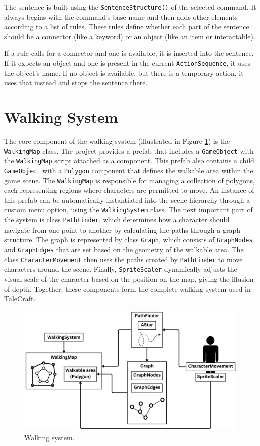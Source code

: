 The sentence is built using the \verb|SentenceStructure()| of the selected command. It always begins with the command’s base name and then adds other elements according to a list of rules. These rules define whether each part of the sentence should be a connector (like a keyword) or an object (like an item or interactable).

If a rule calls for a connector and one is available, it is inserted into the sentence. If it expects an object and one is present in the current \verb|ActionSequence|, it uses the object's name. If no object is available, but there is a temporary action, it uses that instead and stops the sentence there.


\section{Walking System}
\label{Walkingystem}
The core component of the walking system (illustrated in Figure \ref{fig:WalkingSys}) is the \verb|WalkingMap| class. The project provides a prefab that includes a \verb|GameObject| with the \verb|WalkingMap| script attached as a component. This prefab also contains a child \verb|GameObject| with a \verb|Polygon| component that defines the walkable area within the game scene. The \verb|WalkingMap| is responsible for managing a collection of polygons, each representing regions where characters are permitted to move. An instance of this prefab can be automatically instantiated into the scene hierarchy through a custom menu option, using the \verb|WalkingSystem| class. The next important part of the system is class \verb|PathFinder|, which determines how a character should navigate from one point to another by calculating the paths through a graph structure. The graph is represented by class \verb|Graph|, which consists of \verb|GraphNodes| and \verb|GraphEdges| that are set based on the geometry of the walkable area. The class \verb|CharacterMovement| then uses the paths created by \verb|PathFinder| to move characters around the scene. Finally, \verb|SpriteScaler| dynamically adjusts the visual scale of the character based on the position on the map, giving the illusion of depth. Together, these components form the complete walking system used in TaleCraft.


\begin{figure}[H]
\centering
\includegraphics[width=0.85\linewidth]{img/Walking2.png}
\caption{Walking system.}
\label{fig:WalkingSys}
\end{figure}

